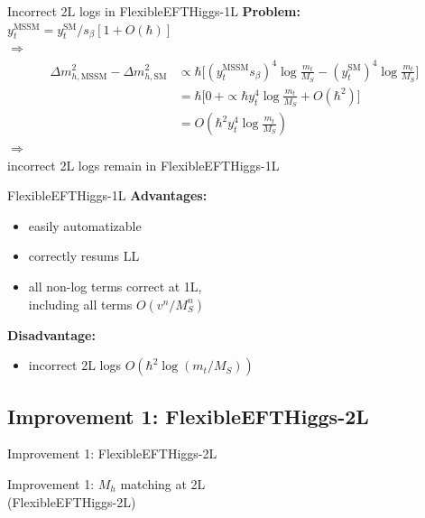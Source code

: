 \documentclass[hyperref={pdfpagelabels=false},ngerman]{beamer}
\newcommand{\cmark}{\ding{51}}%
\newcommand{\xmark}{\ding{55}}%
\newcommand{\ok}{\textcolor{darkgreen}{\cmark}}
\newcommand{\notok}{\textcolor{red}{\xmark}}
\renewcommand{\emph}{\textbf}
\newcommand{\SM}{\ensuremath{\text{SM}}}
\newcommand{\MSSM}{\ensuremath{\text{MSSM}}}
\begin{document}
\begin{frame}{Incorrect 2L logs in FlexibleEFTHiggs-1L}
  \emph{Problem:} $y_t^{\MSSM} = y_t^\SM/s_\beta [1 + O(\hbar)] $\\
  $\Rightarrow$
  \begin{align*}
    \Delta m_{h,\MSSM}^2 - \Delta m_{h,\SM}^2 &\propto
    \hbar \Bigg[ (y_t^\MSSM s_\beta)^4 \log\frac{m_t}{M_S} - (y_t^\SM)^4 \log\frac{m_t}{M_S}\Bigg] \\
    &= \hbar \Bigg[0\ + \propto \hbar y_t^4 \log\frac{m_t}{M_S} + O(\hbar^2) \Bigg] \\
    &= O(\hbar^2 y_t^4 \log\frac{m_t}{M_S})
  \end{align*}
  $\Rightarrow$\\
  incorrect 2L logs remain in FlexibleEFTHiggs-1L
\end{frame}

\begin{frame}{FlexibleEFTHiggs-1L}
  \emph{Advantages:}
  \begin{itemize}
  \item[\ok] easily automatizable
  \item[\ok] correctly resums LL
  \item[\ok] all non-log terms correct at 1L, \\
    including all terms $O(v^n/M_S^n)$
  \end{itemize}
  \emph{Disadvantage:}
  \begin{itemize}
  \item[\notok] incorrect 2L logs $O(\hbar^2 \log(m_t/M_S))$
  \end{itemize}
\end{frame}


\subsection{Improvement 1: FlexibleEFTHiggs-2L}

\begin{frame}{Improvement 1: FlexibleEFTHiggs-2L}
  \begin{center}
    \Large Improvement 1: $M_h$ matching at 2L \\
    (FlexibleEFTHiggs-2L)
  \end{center}
\end{frame}
\end{document}
